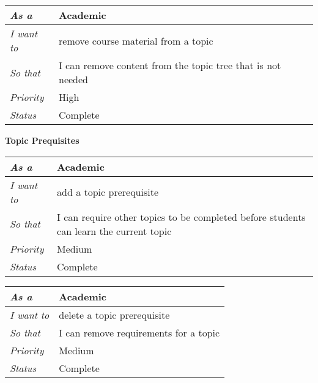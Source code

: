 \begin{table}[hp]
\begin{tabular}{|l|l|}
\hline
\textit{As a}      & Academic                                                    \\ \hline
\textit{I want to} & remove course material from a topic                         \\ \hline
\textit{So that}   & I can remove content from the topic tree that is not needed \\ \hline
\textit{Priority}  & {\color[HTML]{FE0000} High}                                 \\ \hline
\textit{Status}    & Complete                                                    \\ \hline
\end{tabular}
\end{table}

\textbf{Topic Prequisites}

\begin{table}[hp]
\begin{tabular}{|l|l|}
\hline
\textit{As a}      & Academic                                                                               \\ \hline
\textit{I want to} & add a topic prerequisite                                                               \\ \hline
\textit{So that}   & I can require other topics to be completed before students can learn the current topic \\ \hline
\textit{Priority}  & {\color[HTML]{FE996B} Medium}                                                            \\ \hline
\textit{Status}    & Complete                                                                               \\ \hline
\end{tabular}
\end{table}

\begin{table}[hp]
\begin{tabular}{|l|l|}
\hline
\textit{As a}      & Academic                                                                               \\ \hline
\textit{I want to} & delete a topic prerequisite                                                            \\ \hline
\textit{So that}   & I can remove requirements for a topic \\ \hline
\textit{Priority}  & {\color[HTML]{FE996B} Medium}                                                          \\ \hline
\textit{Status}    & Complete                                                                               \\ \hline
\end{tabular}
\end{table}

